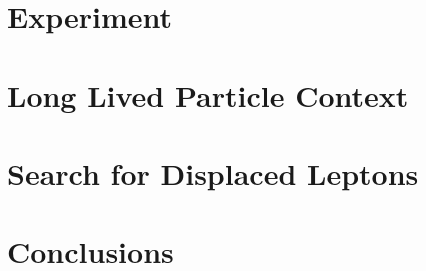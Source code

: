 \documentclass{ucetd}
\begin{document}
\part{Experiment}






\cleardoublepage 

\part{Long Lived Particle Context}



\cleardoublepage
\part{Search for Displaced Leptons}





\cleardoublepage 

\part{Conclusions}


\cleardoublepage 

\printbibliography[heading=bibintoc,title={References}]

%
%
\end{document}
